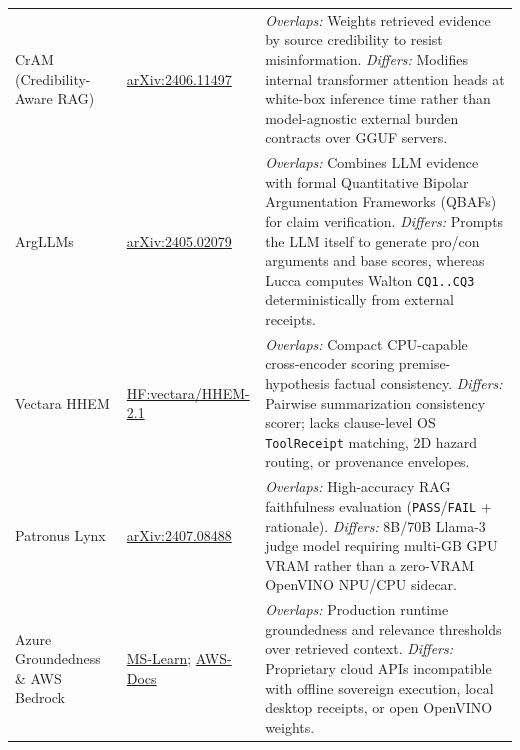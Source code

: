 \documentclass[11pt,a4paper]{article}
\begin{document}
\begin{table}[h]
\begin{tabular}{p{2.7cm}p{2.9cm}p{8.8cm}}
CrAM (Credibility-Aware RAG) \cite{deng2024cram} & \href{https://arxiv.org/abs/2406.11497}{arXiv:2406.11497} & \emph{Overlaps:} Weights retrieved evidence by source credibility to resist misinformation. \emph{Differs:} Modifies internal transformer attention heads at white-box inference time rather than model-agnostic external burden contracts over GGUF servers. \\
ArgLLMs \cite{freedman2024argllms} & \href{https://arxiv.org/abs/2405.02079}{arXiv:2405.02079} & \emph{Overlaps:} Combines LLM evidence with formal Quantitative Bipolar Argumentation Frameworks (QBAFs) for claim verification. \emph{Differs:} Prompts the LLM itself to generate pro/con arguments and base scores, whereas Lucca computes Walton \texttt{CQ1..CQ3} deterministically from external receipts. \\
Vectara HHEM \cite{vectara2024hhem} & \href{https://huggingface.co/vectara/hallucination_evaluation_model}{HF:vectara/HHEM-2.1} & \emph{Overlaps:} Compact CPU-capable cross-encoder scoring premise-hypothesis factual consistency. \emph{Differs:} Pairwise summarization consistency scorer; lacks clause-level OS \texttt{ToolReceipt} matching, 2D hazard routing, or provenance envelopes. \\
Patronus Lynx \cite{ravi2024lynx} & \href{https://arxiv.org/abs/2407.08488}{arXiv:2407.08488} & \emph{Overlaps:} High-accuracy RAG faithfulness evaluation (\texttt{PASS}/\texttt{FAIL} + rationale). \emph{Differs:} 8B/70B Llama-3 judge model requiring multi-GB GPU VRAM rather than a zero-VRAM OpenVINO NPU/CPU sidecar. \\
Azure Groundedness \& AWS Bedrock \cite{azure2024groundedness,aws2024bedrock} & \href{https://learn.microsoft.com/en-us/azure/ai-services/content-safety/concepts/groundedness}{MS-Learn}; \href{https://docs.aws.amazon.com/bedrock/latest/userguide/guardrails-contextual-grounding-check.html}{AWS-Docs} & \emph{Overlaps:} Production runtime groundedness and relevance thresholds over retrieved context. \emph{Differs:} Proprietary cloud APIs incompatible with offline sovereign execution, local desktop receipts, or open OpenVINO weights. \\
\bottomrule
\end{tabular}
\end{table}
\end{document}
